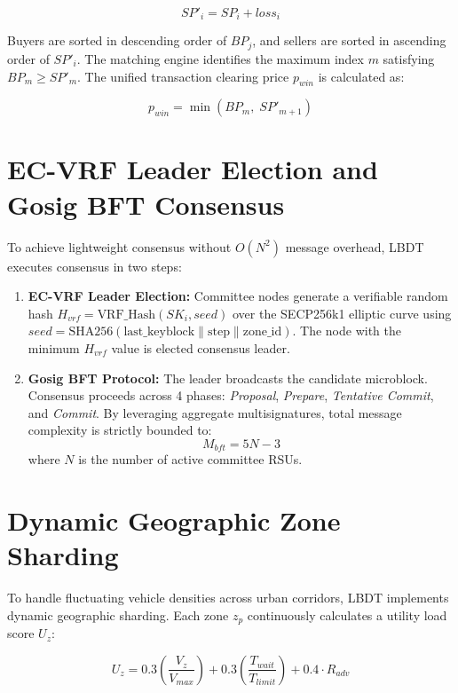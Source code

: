 \begin{equation}
SP'_i = SP_i + loss_i
\end{equation}

Buyers are sorted in descending order of $BP_j$, and sellers are sorted in ascending order of $SP'_i$. The matching engine identifies the maximum index $m$ satisfying $BP_m \ge SP'_m$. The unified transaction clearing price $p_{win}$ is calculated as:

\begin{equation}
p_{win} = \min\left( BP_m, \; SP'_{m+1} \right)
\end{equation}

\section{EC-VRF Leader Election and Gosig BFT Consensus}\label{sec:method_consensus}
\noindent To achieve lightweight consensus without $O(N^2)$ message overhead, LBDT executes consensus in two steps:

\begin{enumerate}
    \item \textbf{EC-VRF Leader Election:} Committee nodes generate a verifiable random hash $H_{vrf} = \text{VRF\_Hash}(SK_i, seed)$ over the SECP256k1 elliptic curve using $seed = \text{SHA256}(\text{last\_keyblock} \parallel \text{step} \parallel \text{zone\_id})$. The node with the minimum $H_{vrf}$ value is elected consensus leader.
    \item \textbf{Gosig BFT Protocol:} The leader broadcasts the candidate microblock. Consensus proceeds across 4 phases: \textit{Proposal}, \textit{Prepare}, \textit{Tentative Commit}, and \textit{Commit}. By leveraging aggregate multisignatures, total message complexity is strictly bounded to:
    \begin{equation}
    M_{bft} = 5N - 3
    \end{equation}
    where $N$ is the number of active committee RSUs.
\end{enumerate}

\section{Dynamic Geographic Zone Sharding}\label{sec:method_sharding}
\noindent To handle fluctuating vehicle densities across urban corridors, LBDT implements dynamic geographic sharding. Each zone $z_p$ continuously calculates a utility load score $U_z$:

\begin{equation}
U_z = 0.3 \left( \frac{V_z}{V_{max}} \right) + 0.3 \left( \frac{T_{wait}}{T_{limit}} \right) + 0.4 \cdot R_{adv}
\end{equation}

